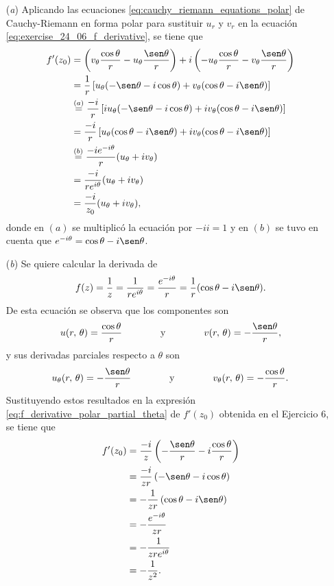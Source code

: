 \documentclass[a4paper]{report}
\begin{document}
\begin{enumerate}
 \item[(\textit{a})] Aplicando las ecuaciones \ref{eq:cauchy_riemann_equations_polar} de Cauchy-Riemann en forma polar para sustituir \(u_r\) y \(v_r\) en la ecuación \ref{eq:exercise_24_06_f_derivative}, se tiene que 
 \begin{align*}
  f'(z_0)&=\left(v_\theta\frac{\cos\theta}{r}-u_\theta\frac{\sen\theta}{r}\right)+i\left(-u_\theta\frac{\cos\theta}{r}-v_\theta\frac{\sen\theta}{r}\right)\\
  &=\frac{1}{r}\left[u_\theta(-\sen\theta-i\cos\theta)+v_\theta(\cos\theta-i\sen\theta)\right]\\
  &\overset{(a)}{=}\frac{-i}{r}\left[iu_\theta(-\sen\theta-i\cos\theta)+iv_\theta(\cos\theta-i\sen\theta)\right]\\
  &=\frac{-i}{r}\left[u_\theta(\cos\theta-i\sen\theta)+iv_\theta(\cos\theta-i\sen\theta)\right]\\
  &\overset{(b)}{=}\frac{-ie^{-i\theta}}{r}(u_\theta+iv_\theta)\\
  &=\frac{-i}{re^{i\theta}}(u_\theta+iv_\theta)\\
  &=\frac{-i}{z_0}(u_\theta+iv_\theta),
 \end{align*}
donde en \((a)\) se multiplicó la ecuación por \(-ii=1\) y en \((b)\) se tuvo en cuenta que \(e^{-i\theta}=\cos\theta-i\sen\theta\).
 \item[(\textit{b})] Se quiere calcular la derivada de 
 \[
  f(z)=\frac{1}{z}=\frac{1}{re^{i\theta}}=\frac{e^{-i\theta}}{r}=\frac{1}{r}(\cos\theta-i\sen\theta).
 \]
 De esta ecuación se observa que los componentes son
 \[
  u(r,\,\theta)=\frac{\cos\theta}{r}
  \qquad\qquad\textrm{y}\qquad\qquad
  v(r,\,\theta)=-\frac{\sen\theta}{r},
 \]
 y sus derivadas parciales respecto a \(\theta\) son
 \[
  u_\theta(r,\,\theta)=-\frac{\sen\theta}{r}
  \qquad\qquad\textrm{y}\qquad\qquad
  v_\theta(r,\,\theta)=-\frac{\cos\theta}{r}.
 \]
 Sustituyendo estos resultados en la expresión \ref{eq:f_derivative_polar_partial_theta} de \(f'(z_0)\) obtenida en el Ejercicio 6, se tiene que
 \begin{align*}
  f'(z_0)&=\frac{-i}{z}\left(-\frac{\sen\theta}{r}-i\frac{\cos\theta}{r}\right)\\
  &=\frac{-i}{zr}\left(-\sen\theta-i\cos\theta\right)\\
  &=-\frac{1}{zr}\left(\cos\theta-i\sen\theta\right)\\
  &=-\frac{e^{-i\theta}}{zr}\\
  &=-\frac{1}{zre^{i\theta}}\\
  &=-\frac{1}{z^2}.
 \end{align*}
\end{enumerate}
\end{document}
